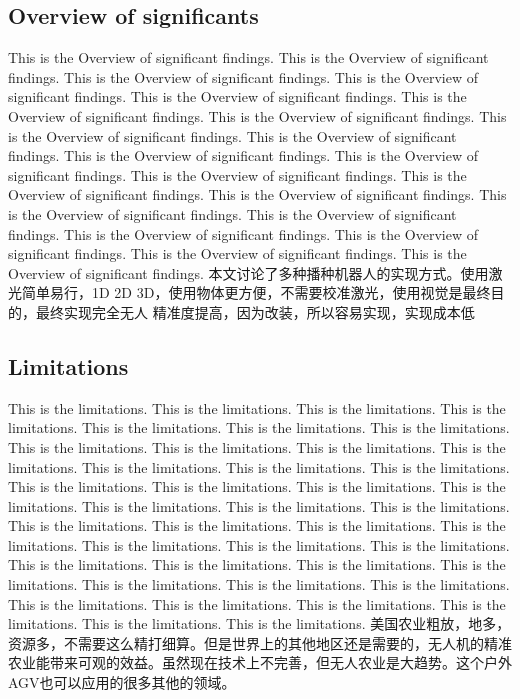 \documentclass[12pt]{article}
\begin{document}
\begin{flushleft}
\subsection{Overview of significants}
This is the Overview of significant findings. This is the Overview of significant findings. This is the Overview of significant findings. This is the Overview of significant findings. This is the Overview of significant findings. This is the Overview of significant findings. This is the Overview of significant findings. This is the Overview of significant findings. This is the Overview of significant findings. This is the Overview of significant findings. This is the Overview of significant findings. This is the Overview of significant findings. This is the Overview of significant findings. This is the Overview of significant findings. This is the Overview of significant findings. This is the Overview of significant findings. This is the Overview of significant findings. This is the Overview of significant findings. This is the Overview of significant findings. This is the Overview of significant findings. 
本文讨论了多种播种机器人的实现方式。使用激光简单易行，1D 2D 3D，使用物体更方便，不需要校准激光，使用视觉是最终目的，最终实现完全无人
精准度提高，因为改装，所以容易实现，实现成本低

\subsection{Limitations}
This is the limitations. This is the limitations. This is the limitations. This is the limitations. This is the limitations. This is the limitations. This is the limitations. This is the limitations. This is the limitations. This is the limitations. This is the limitations. This is the limitations. This is the limitations. This is the limitations. This is the limitations. This is the limitations. This is the limitations. This is the limitations. This is the limitations. This is the limitations. This is the limitations. This is the limitations. This is the limitations. This is the limitations. This is the limitations. This is the limitations. This is the limitations. This is the limitations. This is the limitations. This is the limitations. This is the limitations. This is the limitations. This is the limitations. This is the limitations. This is the limitations. This is the limitations. This is the limitations. This is the limitations. This is the limitations. This is the limitations. This is the limitations. 
美国农业粗放，地多，资源多，不需要这么精打细算。但是世界上的其他地区还是需要的，无人机的精准农业能带来可观的效益。虽然现在技术上不完善，但无人农业是大趋势。这个户外AGV也可以应用的很多其他的领域。


\end{flushleft}
\end{document}
